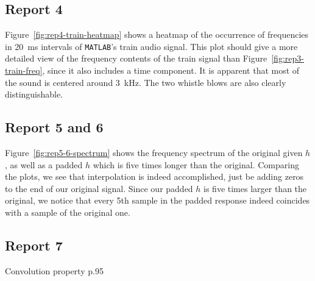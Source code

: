 \documentclass[11pt,titlepage]{report}
\begin{document}
\subsection{Report 4}
Figure~\ref{fig:rep4-train-heatmap} shows a heatmap of the occurrence of frequencies in \SI{20}{\milli\second} intervals of \texttt{MATLAB}'s train audio signal. This plot should give a more detailed view of the frequency contents of the train signal than Figure~\ref{fig:rep3-train-freq}, since it also includes a time component. It is apparent that most of the sound is centered around \SI{3}{\kilo\hertz}. The two whistle blows are also clearly distinguishable.


\subsection{Report 5 and 6}


Figure~\ref{fig:rep5-6-spectrum} shows the frequency spectrum of the original given $h$, as well as a padded $h$ which is five times longer than the original. Comparing the plots, we see that interpolation is indeed accomplished, just be adding zeros to the end of our original signal. Since our padded $h$ is five times larger than the original, we notice that every 5th sample in the padded response indeed coincides with a sample of the original one.

\subsection{Report 7}
Convolution property p.95
\end{document}
